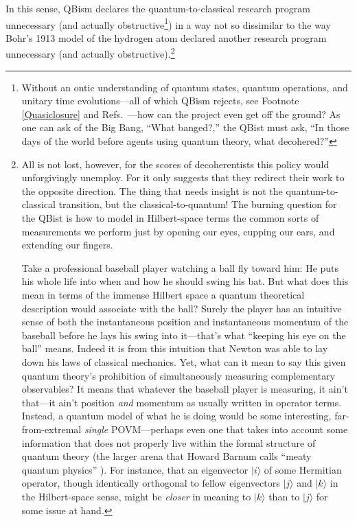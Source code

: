In this sense, QBism declares the quantum-to-classical research program unnecessary (and actually obstructive\footnote{Without an ontic understanding of quantum states, quantum operations, and unitary time evolutions---all of which QBism rejects, see Footnote \ref{Quasiclosure} and Refs.~\cite{Fuchs02,Fuchs09a,Leifer06}---how can the project even get off the ground?  As one can ask of the Big Bang, ``What banged?,'' the QBist must ask, ``In those days of the world before agents using quantum theory, what decohered?''}) in a way not so dissimilar to the way Bohr's 1913 model of the hydrogen atom declared another research program unnecessary (and actually obstructive).\footnote{All is not lost, however, for the scores of decoherentists this policy would unforgivingly unemploy.  For it only suggests that they redirect their work to the opposite direction.  The thing that needs insight is not the quantum-to-classical transition, but the classical-to-quantum!  The burning question for the QBist is how to model in Hilbert-space terms the common sorts of measurements we perform just by opening our eyes, cupping our ears, and extending our fingers.%

Take a professional baseball player watching a ball fly toward him:  He puts his whole life into when and how he should swing his bat.  But what does this mean in terms of the immense Hilbert space a quantum theoretical description would associate with the ball?  Surely the player has an intuitive sense of both the instantaneous position and instantaneous momentum of the baseball before he lays his swing into it---that's what ``keeping his eye on the ball'' means.  Indeed it is from this intuition that Newton was able to lay down his laws of classical mechanics.   Yet, what can it mean to say this given quantum theory's prohibition of simultaneously measuring complementary observables?  It means that whatever the baseball player is measuring, it ain't that---it ain't position {\it and\/} momentum as usually written in operator terms.  Instead, a quantum model of what he is doing would be some interesting, far-from-extremal {\it single\/} POVM---perhaps even one that takes into account some information that does not properly live within the formal structure of quantum theory (the larger arena that Howard Barnum calls ``meaty quantum physics'' \cite{Barnum10}). For instance, that an eigenvector $|i\rangle$ of some Hermitian operator, though identically orthogonal to fellow eigenvectors $|j\rangle$ and $|k\rangle$ in the Hilbert-space sense, might be {\it closer\/} in meaning to $|k\rangle$ than to $|j\rangle$ for some issue at hand.%

}

